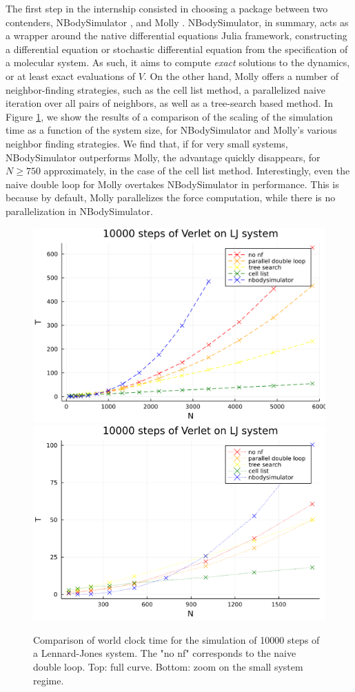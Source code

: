 The first step in the internship consisted in choosing a package between two contenders, NBodySimulator \cite{NBS}, and Molly \cite{Molly}. 
NBodySimulator, in summary, acts as a wrapper around the native differential equations Julia framework, constructing a differential equation or stochastic differential equation from the specification of a molecular system.
As such, it aims to compute \textit{exact} solutions to the dynamics, or at least exact evaluations of $V$. 
On the other hand, Molly offers a number of neighbor-finding strategies, such as the cell list method, a parallelized naive iteration over all pairs of neighbors, as well as a tree-search based method. 
In Figure \ref{fig:linear_scaling}, we show the results of a comparison of the scaling of the simulation time as a function of the system size, for NBodySimulator and Molly's various neighbor finding strategies.
We find that, if for very small systems, NBodySimulator outperforms Molly, the advantage quickly disappears, for $N \geq 750$ approximately, in the case of the cell list method.
Interestingly, even the naive double loop for Molly overtakes NBodySimulator in performance. This is because by default, Molly parallelizes the force computation, while there is no parallelization in NBodySimulator.

\begin{figure}[htbp]
    \begin{center}
      \includegraphics[width=0.7\linewidth]{figures/appendix/scaling_comparison_full.png}
      \includegraphics[width=0.7\linewidth]{figures/appendix/scaling_smallN.png}
      \caption{ \label{fig:linear_scaling}
        Comparison of world clock time for the simulation of 10000 steps of a Lennard-Jones system. The "no nf" corresponds to the naive double loop. Top: full curve. Bottom: zoom on the small system regime.
      }
    \end{center}
  \end{figure}

